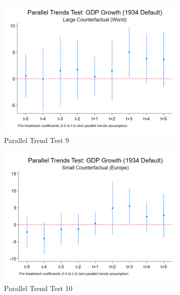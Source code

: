 \begin{figure}[ht!]
    \centering
    \begin{subfigure}[b]{0.48\textwidth}
        \centering
        \includegraphics[width=\textwidth]{figures/PT_GDP_1934_Large.png}
        \caption{Parallel Trend Test 9}
        \label{fig:pt9}
    \end{subfigure}
    \hfill
    \begin{subfigure}[b]{0.48\textwidth}
        \centering
        \includegraphics[width=\textwidth]{figures/PT_GDP_1934_Small.png}
        \caption{Parallel Trend Test 10}
        \label{fig:pt10}
    \end{subfigure}
    \hfill
    \begin{subfigure}[b]{0.48\textwidth}

\end{subfigure}
\end{figure}
